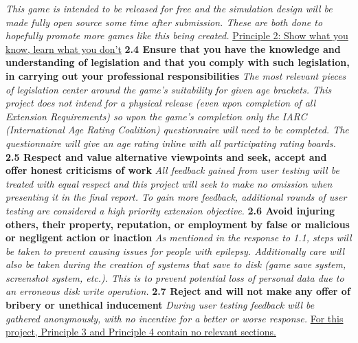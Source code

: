 \documentclass{report}
\begin{document}
\begin{raggedright}
\newline
\newline
\textit{This game is intended to be released for free and the simulation design will be made fully open source some time after submission. These are both done to hopefully promote more games like this being created.}
\newline
\newline
{\Large \underline{Principle 2: Show what you know, learn what you don't}}
\newline
\newline
\textbf{2.4 Ensure that you have the knowledge and understanding of legislation and that you comply with such legislation, in carrying out your professional responsibilities}
\newline
\newline
\textit{The most relevant pieces of legislation center around the game's suitability for given age brackets. This project does not intend for a physical release (even upon completion of all Extension Requirements) so upon the game's completion only the IARC (International Age Rating Coalition) questionnaire will need to be completed. The questionnaire will give an age rating inline with all participating rating boards.}
\newline
\newline
\textbf{2.5 Respect and value alternative viewpoints and seek, accept and offer honest criticisms of work}
\newline
\newline
\textit{All feedback gained from user testing will be treated with equal respect and this project will seek to make no omission when presenting it in the final report. To gain more feedback, additional rounds of user testing are considered a high priority extension objective.}
\newline
\newline
\textbf{2.6 Avoid injuring others, their property, reputation, or employment by false or malicious or negligent action or inaction}
\newline
\newline
\textit{As mentioned in the response to 1.1, steps will be taken to prevent causing issues for people with epilepsy. Additionally care will also be taken during the creation of systems that save to disk (game save system, screenshot system, etc.). This is to prevent potential loss of personal data due to an erroneous disk write operation.}
\newline
\newline
\textbf{2.7 Reject and will not make any offer of bribery or unethical inducement}
\newline
\newline
\textit{During user testing feedback will be gathered anonymously, with no incentive for a better or worse response.}
\newline
\newline
\underline{For this project, Principle 3 and Principle 4 contain no relevant sections.}
\end{raggedright}
\end{document}
